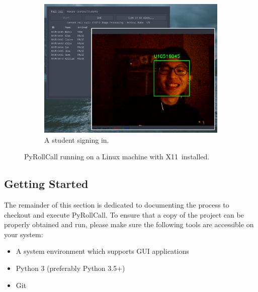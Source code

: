 \begin{figure}[!htb]
\begin{subfigure}[b]{0.32\linewidth}
    \includegraphics[width=\linewidth]{figures/preview3.eps}
    \caption{A student signing in.}
  \end{subfigure}
  \caption{PyRollCall running on a Linux machine with X11\protect\footnotemark \ installed.}
  \label{fig:systemAppearance}
\end{figure}



\subsection{Getting Started}
The remainder of this section is dedicated to documenting the process to checkout and
execute PyRollCall. To ensure that a copy of the project can be properly obtained and
run, please make sure the following tools are accessible on your system:
\vspace{0.5cm}

\begin{itemize}
  \item A system environment which supports GUI applications
  \item Python 3 (preferably Python 3.5+)
  \item Git
 \end{itemize}
\setstretch{\myContentLineSpacing}


